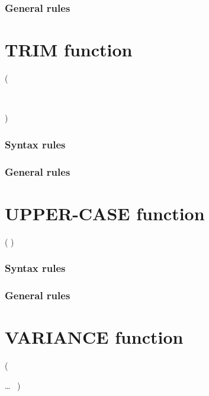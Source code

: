 \subsubsection{General rules}

\section{TRIM function}

\begin{syntax}
    ( \argument
  \begin{0-1}
     \\
  \end{0-1}
  )
\end{syntax}

\subsubsection{Syntax rules}

\subsubsection{General rules}

\section{UPPER-CASE function}

\begin{syntax}
    ( \argument )
\end{syntax}

\subsubsection{Syntax rules}

\subsubsection{General rules}

\section{VARIANCE function}

\begin{syntax}
    (
  \begin{1=}
    \argument
  \end{1=}\ldots
  \ {})
\end{syntax}

